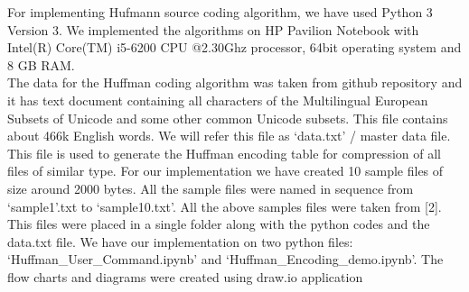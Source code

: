 \textnormal{
For implementing Hufmann source coding algorithm, we have used Python 3 Version 3. We implemented the algorithms on HP Pavilion Notebook with Intel(R) Core(TM) i5-6200 CPU @2.30Ghz processor, 64bit operating system and 8 GB RAM.  
\\
The data for the Huffman coding algorithm was taken from github repository and it has text document containing all characters of the Multilingual European Subsets of Unicode and some other common Unicode subsets. This file contains about 466k English words. We will refer this file as `data.txt' / master data file. This file is used to generate the Huffman encoding table for compression of all files of similar type. For our implementation we have created 10 sample files of size around 2000 bytes. All the sample files were named in sequence from `sample1'.txt to `sample10.txt'. All the above samples files were taken from [2]. This files were placed in a single folder along with the python codes and the data.txt file. We have our implementation on two python files: `Huffman\_User\_Command.ipynb' and `Huffman\_Encoding\_demo.ipynb'.
The flow charts and diagrams were created using draw.io application 
}





